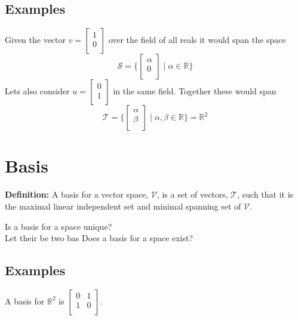 \documentclass[a4paper]{article}
\begin{document}
\subsection{Examples}
Given the vector $v = \begin{bmatrix}1\\0\\\end{bmatrix}$ over the field of all reals it would span the space 
$$
\mathcal{S} = \bigg\{\begin{bmatrix}\alpha\\0\\\end{bmatrix}\mid \alpha\in\mathbb{R}\bigg\}
$$
Lets also consider $u = \begin{bmatrix}0\\1\\\end{bmatrix}$ in the same field. Together these would span
$$
\mathcal{T} = \bigg\{\begin{bmatrix}\alpha\\\beta\\\end{bmatrix}\mid\alpha,\beta\in\mathbb{R}\bigg\} = \mathbb{R}^{2}
$$

\section{Basis}
\textbf{Definition:} A basis for a vector space, $\mathcal{V}$, is a set of vectors, $\mathcal{T}$, such that it is the maximal linear independent set and minimal spanning set of $\mathcal{V}$.

Is a basis for a space unique?\\
Let their be two bas
Does a basis for a space exist?\\
\subsection{Examples}
A basis for $\mathbb{R}^{2}$ is $\begin{bmatrix} 0 & 1\\ 1 & 0\\ \end{bmatrix}$.\\
\end{document}

